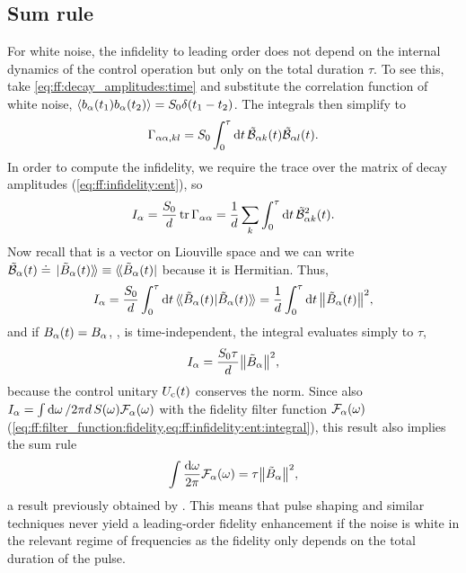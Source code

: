 \subsection{Sum rule}\label{subsec:app:ff:sum_rule}
For white noise, the infidelity to leading order does not depend on the internal dynamics of the control operation but only on the total duration $\tau$.
To see this, take \cref{eq:ff:decay_amplitudes:time} and substitute the correlation function of white noise, $\ev{b_\alpha(t_1)b_\alpha(t_2)}=S_0\delta(t_1-t_2)$.
The integrals then simplify to
\begin{equation}
    \Gamma_{\alpha\alpha,kl} = S_0\int_0^{\tau}\dd{t}\tilde{\mathcal{B}}_{\alpha k}(t)\tilde{\mathcal{B}}_{\alpha l}(t).
\end{equation}
In order to compute the infidelity, we require the trace over the matrix of decay amplitudes (\cref{eq:ff:infidelity:ent}), so
\begin{equation}
    I_{\alpha} = \frac{S_0}{d}\trace\decayamps_{\alpha\alpha} = \frac{1}{d}\sum_k\int_0^{\tau}\dd{t}\ctrlmat_{\alpha k}^2(t).
\end{equation}
Now recall that \ctrlmat is a vector on Liouville space and we can write $\ctrlmat_{\alpha}(t)\doteq\dket*{\Bat(t)}\equiv\dbra*{\Bat(t)}$ because it is Hermitian.
Thus,
\begin{equation}
    I_{\alpha} = \frac{S_0}{d}\int_0^{\tau}\dd{t}\dip*{\Bat(t)}{\Bat(t)} = \frac{1}{d}\int_0^{\tau}\dd{t}\norm{\Bat(t)}^2,
\end{equation}
and if $B_\alpha(t)=B_\alpha$, \ie, is time-independent, the integral evaluates simply to $\tau$,
\begin{equation}
    I_{\alpha} = \frac{S_0\tau}{d}\norm{\tilde{B}_\alpha}^2,
\end{equation}
because the control unitary $U_{\mathrm{c}}(t)$ conserves the norm.
Since also $I_{\alpha}=\int\dd{\omega}/2\pi d\,S(\omega)\mathcal{F}_\alpha(\omega)$ with the fidelity filter function $\mathcal{F}_\alpha(\omega)$ (\cref{eq:ff:filter_function:fidelity,eq:ff:infidelity:ent:integral}), this result also implies the sum rule
\begin{equation}\label{eq:app:ff:sum_rule}
    \int\frac{\dd{\omega}}{2\pi}\mathcal{F}_{\alpha}(\omega) = \tau\norm{\tilde{B}_\alpha}^2,
\end{equation}
a result previously obtained by \citet{Cywinski2008}.
This means that pulse shaping and similar techniques never yield a leading-order fidelity enhancement if the noise is white in the relevant regime of frequencies as the fidelity only depends on the total duration of the pulse.


